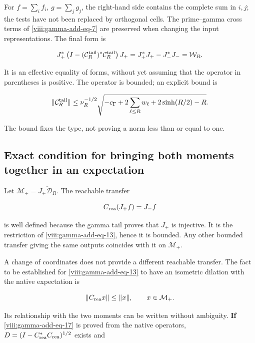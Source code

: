 For \(f=\sum_i f_i\), \(g=\sum_j g_j\), the right-hand side contains the complete sum in \(i,j\); the tests have not been replaced by orthogonal cells. The prime--gamma cross terms of \eqref{viii:gamma-add-eq-7} are preserved when changing the input representations. The final form is

\begin{equation}
J_+^*\left(I-(\mathcal C_R^{\rm tail})^*\mathcal C_R^{\rm tail}\right)J_+
=J_+^*J_+-J_-^*J_-=\mathcal W_R.
\label{viii:gamma-add-eq-16}
\end{equation}

It is an effective equality of forms, without yet assuming that the operator in parentheses is positive. The operator is bounded; an explicit bound is

\begin{equation}
\|\mathcal C_R^{\rm tail}\|
\le\nu_R^{-1/2}
\sqrt{-c_\Gamma+2\sum_{\ell\le R}w_\ell+2\sinh(R/2)-R}.
\label{viii:gamma-add-display-33}
\end{equation}

The bound fixes the type, not proving a norm less than or equal to one.

\subsection{Exact condition for bringing both moments together in an expectation}
\label{viii:gamma-add-sub-375}

Let \(\mathcal M_+=\overline{J_+\mathcal D_R}\). The reachable transfer

\begin{equation}
C_{\rm rea}(J_+f)=J_-f
\label{viii:gamma-add-display-34}
\end{equation}

is well defined because the gamma tail proves that \(J_+\) is injective. It is the restriction of \eqref{viii:gamma-add-eq-13}, hence it is bounded. Any other bounded transfer giving the same outputs coincides with it on \(\mathcal M_+\).

A change of coordinates does not provide a different reachable transfer. The fact to be established for \eqref{viii:gamma-add-eq-13} to have an isometric dilation with the native expectation is

\begin{equation}
\|C_{\rm rea}x\|\le\|x\|,
\qquad x\in\mathcal M_+.
\label{viii:gamma-add-eq-17}
\end{equation}

Its relationship with the two moments can be written without ambiguity. \textbf{If} \eqref{viii:gamma-add-eq-17} is proved from the native operators, \(D=(I-C_{\rm rea}^*C_{\rm rea})^{1/2}\) exists and

